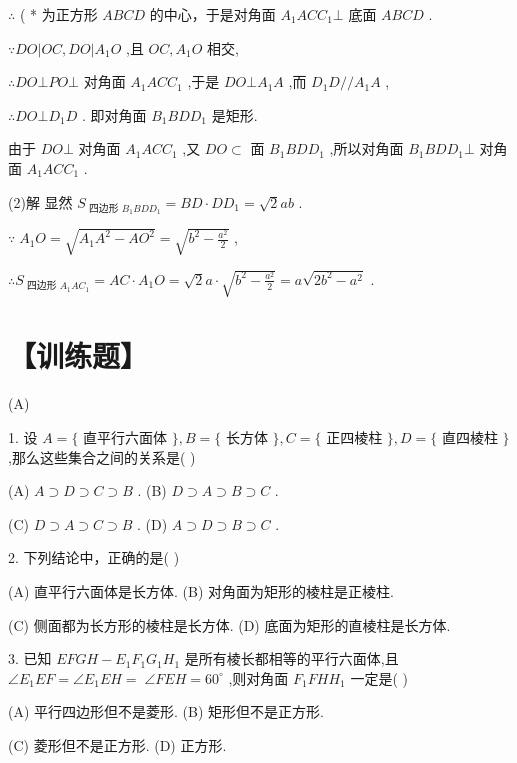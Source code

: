 \documentclass[10pt]{article}
\begin{document}
\(\therefore\) ( * 为正方形 \({ABCD}\) 的中心，于是对角面 \({A}_{1}{AC}{C}_{1} \bot\) 底面 \({ABCD}\) .

\(\because {DO}\left| {{OC},{DO}}\right| {A}_{1}O\) ,且 \({OC},{A}_{1}O\) 相交,

\(\therefore {DO} \bot  {PO} \bot\) 对角面 \({A}_{1}{AC}{C}_{1}\) ,于是 \({DO} \bot  {A}_{1}A\) ,而 \({D}_{1}D//{A}_{1}A\) ,

\(\therefore {DO} \bot  {D}_{1}D\) . 即对角面 \({B}_{1}{BD}{D}_{1}\) 是矩形.

由于 \({DO} \bot\) 对角面 \({A}_{1}{AC}{C}_{1}\) ,又 \({DO} \subset\) 面 \({B}_{1}{BD}{D}_{1}\) ,所以对角面 \({B}_{1}{BD}{D}_{1} \bot\) 对角面 \({A}_{1}{AC}{C}_{1}\) .

(2)解 显然 \({S}_{\text{ 四边形 }{B}_{1}{BD}{D}_{1}} = {BD} \cdot  D{D}_{1} = \sqrt{2}{ab}\) .

\(\because \;{A}_{1}O = \sqrt{{A}_{1}{A}^{2} - A{O}^{2}} = \sqrt{{b}^{2} - \frac{{a}^{2}}{2}}\) ,

\(\therefore {S}_{\text{ 四边形 }{A}_{1}A{C}_{1}} = {AC} \cdot  {A}_{1}O = \sqrt{2}a \cdot  \sqrt{{b}^{2} - \frac{{a}^{2}}{2}} = a\sqrt{2{b}^{2} - {a}^{2}}\) .

\section*{【训练题】}

(A)

1. 设 \(A = \{\) 直平行六面体 \(\} ,B = \{\) 长方体 \(\} ,C = \{\) 正四棱柱 \(\} ,D = \{\) 直四棱柱 \(\}\) ,那么这些集合之间的关系是( )

(A) \(A \supset  D \supset  C \supset  B\) . (B) \(D \supset  A \supset  B \supset  C\) .

(C) \(D \supset  A \supset  C \supset  B\) . (D) \(A \supset  D \supset  B \supset  C\) .

2. 下列结论中，正确的是( )

(A) 直平行六面体是长方体. (B) 对角面为矩形的棱柱是正棱柱.

(C) 侧面都为长方形的棱柱是长方体. (D) 底面为矩形的直棱柱是长方体.

3. 已知 \({EFGH} - {E}_{1}{F}_{1}{G}_{1}{H}_{1}\) 是所有棱长都相等的平行六面体,且 \(\angle {E}_{1}{EF} = \angle {E}_{1}{EH} = \; \angle {FEH} = {60}^{ \circ  }\) ,则对角面 \({F}_{1}{FH}{H}_{1}\) 一定是( )

(A) 平行四边形但不是菱形. (B) 矩形但不是正方形.

(C) 菱形但不是正方形. (D) 正方形.
\end{document}
